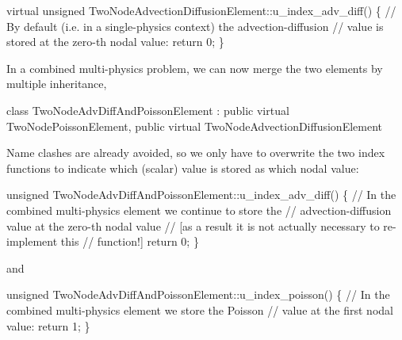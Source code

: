 \begin{DoxyCode}
\textcolor{keyword}{virtual} \textcolor{keywordtype}{unsigned} TwoNodeAdvectionDiffusionElement::u\_index\_adv\_diff()
 \{
  \textcolor{comment}{// By default (i.e. in a single-physics context) the advection-diffusion}
  \textcolor{comment}{// value is stored at the zero-th nodal value:}
  \textcolor{keywordflow}{return} 0;
 \}
\end{DoxyCode}


In a combined multi-\/physics problem, we can now merge the two elements by multiple inheritance,


\begin{DoxyCode}
\textcolor{keyword}{class }TwoNodeAdvDiffAndPoissonElement : 
       \textcolor{keyword}{public} \textcolor{keyword}{virtual} TwoNodePoissonElement,
       \textcolor{keyword}{public} \textcolor{keyword}{virtual} TwoNodeAdvectionDiffusionElement
\end{DoxyCode}


Name clashes are already avoided, so we only have to overwrite the two index functions to indicate which (scalar) value is stored as which nodal value\+:


\begin{DoxyCode}
\textcolor{keywordtype}{unsigned} TwoNodeAdvDiffAndPoissonElement::u\_index\_adv\_diff()
 \{
  \textcolor{comment}{// In the combined multi-physics element we continue to store the }
  \textcolor{comment}{// advection-diffusion value at the zero-th nodal value}
  \textcolor{comment}{// [as a result it is not actually necessary to re-implement this}
  \textcolor{comment}{// function!]}
  \textcolor{keywordflow}{return} 0;
 \}
\end{DoxyCode}


and


\begin{DoxyCode}
\textcolor{keywordtype}{unsigned} TwoNodeAdvDiffAndPoissonElement::u\_index\_poisson()
 \{
  \textcolor{comment}{// In the combined multi-physics element we store the Poisson}
  \textcolor{comment}{// value at the first nodal value:}
  \textcolor{keywordflow}{return} 1;
 \}
\end{DoxyCode}


